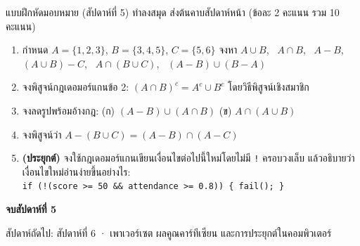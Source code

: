 \begin{frame}{แบบฝึกหัดมอบหมาย (สัปดาห์ที่ 5)}
  ทำลงสมุด ส่งต้นคาบสัปดาห์หน้า (ข้อละ 2 คะแนน รวม 10 คะแนน)
  \begin{enumerate}\small
    \item กำหนด $A = \{1,2,3\}$, $B = \{3,4,5\}$, $C = \{5,6\}$ จงหา
          $A \cup B$, \ $A \cap B$, \ $A - B$, \ $(A \cup B) - C$, \ $A \cap (B \cup C)$, \ $(A-B) \cup (B-A)$
    \item จงพิสูจน์กฎเดอมอร์แกนข้อ 2: $(A \cap B)^c = A^c \cup B^c$ โดยวิธีพิสูจน์เชิงสมาชิก
    \item จงลดรูปพร้อมอ้างกฎ: (ก) $(A - B) \cup (A \cap B)$ \quad (ข) $A \cap (A \cup B)$
    \item จงพิสูจน์ว่า $A - (B \cup C) = (A - B) \cap (A - C)$
    \item \textbf{(ประยุกต์)} จงใช้กฎเดอมอร์แกนเขียนเงื่อนไขต่อไปนี้ใหม่โดยไม่มี \texttt{!} ครอบวงเล็บ
          แล้วอธิบายว่าเงื่อนไขใหม่อ่านง่ายขึ้นอย่างไร: \\
          \texttt{if (!(score >= 50 \&\& attendance >= 0.8)) \{ fail(); \}}
  \end{enumerate}
\end{frame}

\begin{frame}[plain]
  \vfill
  \centering
  {\Large\color{navy}\textbf{จบสัปดาห์ที่ 5}}\par
  \vspace{0.8em}
  {\color{gray} สัปดาห์ถัดไป: สัปดาห์ที่ 6 · เพาเวอร์เซต ผลคูณคาร์ทีเซียน และการประยุกต์ในคอมพิวเตอร์}
  \vfill
\end{frame}
